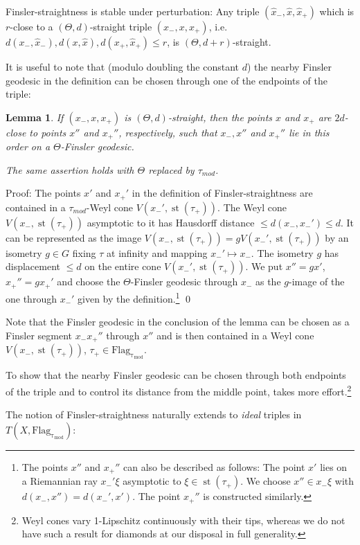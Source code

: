 \documentclass[12pt]{article}
\theoremstyle{boldplain}
\newtheorem{lem}[equation]{Lemma}
\theoremstyle{bolddefinition}
\numberwithin{equation}{section}
\def\Flagt{\operatorname{Flag_{\tau_{mod}}}}
\def\st{\operatorname{st}}
\def\taumod{\tau_{mod}}
\begin{document}
Finsler-straightness is stable under perturbation:
Any triple $(\hat x_-,\hat x,\hat x_+)$ which is $r$-close to a $(\Theta,d)$-straight triple $(x_-,x,x_+)$, 
i.e. $d(x_-,\hat x_-),d(x,\hat x),d(x_+,\hat x_+)\leq r$,
is $(\Theta,d+r)$-straight. 


\medskip
It is useful to note that (modulo doubling the constant $d$)
the nearby Finsler geodesic in the definition can be chosen through one of the endpoints of the triple:
\begin{lem}
\label{lem:thrghnndpt}
If $(x_-,x,x_+)$ is $(\Theta,d)$-straight,
then the points $x$ and $x_+$ are $2d$-close to points $x''$ and $x_+''$,
respectively, 
such that $x_-,x''$ and $x_+''$ lie in this order on a $\Theta$-Finsler geodesic.

The same assertion holds with $\Theta$ replaced by $\taumod$.
\end{lem}
Proof:
The points $x'$ and $x_+'$ in the definition of Finsler-straightness 
are contained in a $\taumod$-Weyl cone $V(x_-',\st(\tau_+))$.
The Weyl cone $V(x_-,\st(\tau_+))$ asymptotic to it has Hausdorff distance $\leq d(x_-,x_-')\leq d$.
It can be represented as the image $V(x_-,\st(\tau_+))=gV(x_-',\st(\tau_+))$ by an isometry $g\in G$
fixing $\tau$ at infinity and mapping $x_-'\mapsto x_-$.
The isometry $g$ has displacement $\leq d$ on the entire cone $V(x_-',\st(\tau_+))$.
We put $x''=gx'$, $x_+''=gx_+'$ and choose the $\Theta$-Finsler geodesic through $x_-$ as the $g$-image of the one through $x_-'$
given by the definition.\footnote{The points $x''$ and $x_+''$ can also be described as follows:
The point $x'$ lies on a Riemannian ray $x_-'\xi$ asymptotic to $\xi\in\st(\tau_+)$.
We choose $x''\in x_-\xi$ with $d(x_-,x'')=d(x_-',x')$.
The point $x_+''$ is constructed similarly.}
\qed

\medskip
Note that the Finsler geodesic in the conclusion of the lemma can be chosen as a Finsler segment $x_-x_+''$
through $x''$ and is then contained in a Weyl cone $V(x_-,\st(\tau_+))$, $\tau_+\in\Flagt$.

To show that the nearby Finsler geodesic can be chosen through both endpoints of the triple
and to control its distance from the middle point,
takes more effort.\footnote{Weyl cones vary 1-Lipschitz continuously with their tips,
whereas we do not have such a result for diamonds at our disposal in full generality.}

\medskip
The notion of Finsler-straightness naturally extends to {\em ideal} triples in 
$T(X,\Flagt)$: 
\end{document}
